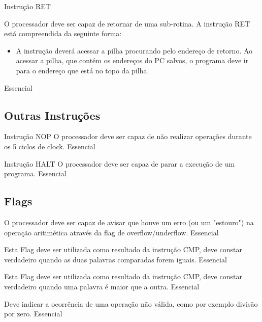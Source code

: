 \documentclass{article}
\begin{document}
\begin{functional}
      \requirement
      {Instrução RET}
      {O processador deve ser capaz de retornar de uma sub-rotina.
      A instrução RET está compreendida da seguinte forma:\\
      \begin{itemize}
         \item A instrução deverá acessar a pilha procurando pelo endereço de retorno. Ao acessar a pilha, que contém os endereços do PC salvos, o programa deve ir para o endereço que está no topo da pilha.
        \end{itemize}
        }
      {Essencial}

    \end{functional}

    \subsection{Outras Instruções}

    \begin{functional}

      \requirement
      {Instrução NOP}
      {O processador deve ser capaz de não realizar operações durante os 5 ciclos de clock.}
      {Essencial}

      \requirement
      {Instrução HALT}
      {O processador deve ser capaz de parar a execução de um programa.}
      {Essencial}

    \end{functional}

    \subsection{Flags}

    \begin{functional}

      {O processador deve ser capaz de avisar que houve um erro (ou um "estouro") na operação aritimética através da flag de overflow/underflow.}
      {Essencial}

      {Esta Flag deve ser utilizada como resultado da instrução CMP, deve constar verdadeiro quando as duas palavras comparadas forem iguais.}
      {Essencial}

      {Esta Flag deve ser utilizada como resultado da instrução CMP, deve constar verdadeiro quando uma palavra é maior que a outra.}
      {Essencial}

      {Deve indicar a ocorrência de uma operação não válida, como por exemplo divisão por zero.}
      {Essencial}

     \end{functional}
\end{document}
